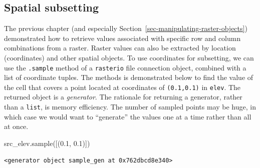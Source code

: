 \documentclass[
  letterpaper,
]{krantz}
\newenvironment{Shaded}{\begin{snugshade}}{\end{snugshade}}
\newcommand{\FloatTok}[1]{\textcolor[rgb]{0.68,0.00,0.00}{#1}}
\newcommand{\NormalTok}[1]{\textcolor[rgb]{0.00,0.23,0.31}{#1}}
\begin{document}
\subsection{Spatial subsetting}\label{sec-spatial-subsetting-raster}

The previous chapter (and especially
Section~\ref{sec-manipulating-raster-objects}) demonstrated how to
retrieve values associated with specific row and column combinations
from a raster. Raster values can also be extracted by location
(coordinates) and other spatial objects. To use coordinates for
subsetting, we can use the \texttt{.sample} method of a
\texttt{rasterio} file connection object, combined with a list of
coordinate tuples. The methods is demonstrated below to find the value
of the cell that covers a point located at coordinates of
\texttt{(0.1,0.1)} in \texttt{elev}. The returned object is a
\emph{generator}. The rationale for returning a generator, rather than a
\texttt{list}, is memory efficiency. The number of sampled points may be
huge, in which case we would want to ``generate'' the values one at a
time rather than all at once.

\begin{Shaded}
\begin{Highlighting}[]
\NormalTok{src\_elev.sample([(}\FloatTok{0.1}\NormalTok{, }\FloatTok{0.1}\NormalTok{)])}
\end{Highlighting}
\end{Shaded}

\begin{verbatim}
<generator object sample_gen at 0x762dbcd8e340>
\end{verbatim}
\end{document}
